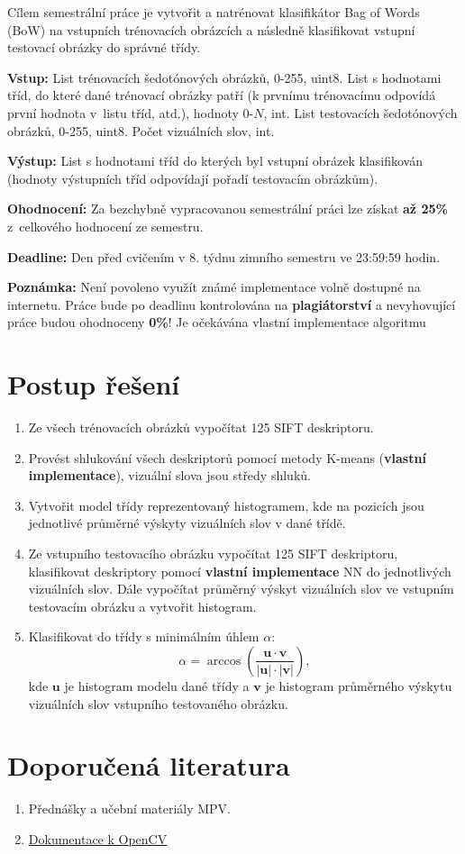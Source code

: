 \documentclass[12pt, a4paper]{article}
\begin{document}
\par{Cílem semestrální práce je vytvořit a natrénovat klasifikátor Bag of Words (BoW) na vstupních trénovacích obrázcích a následně klasifikovat vstupní testovací obrázky do správné třídy.}

\par{\textbf{Vstup:} List trénovacích šedotónových obrázků, 0-255, uint8. List s hodnotami tříd, do které dané trénovací obrázky patří (k prvnímu trénovacímu odpovídá první hodnota v~listu tříd, atd.), hodnoty 0-$N$, int. List testovacích šedotónových obrázků, 0-255, uint8. Počet vizuálních slov, int.}

\par{\textbf{Výstup:} List s hodnotami tříd do kterých byl vstupní obrázek klasifikován (hodnoty výstupních tříd odpovídají pořadí testovacím obrázkům).}

\par{\textbf{Ohodnocení:} Za bezchybně vypracovanou semestrální práci lze získat \textbf{až 25\%} z~celkového hodnocení ze semestru.}

\par{\textbf{Deadline:} Den před cvičením v 8. týdnu zimního semestru ve 23:59:59 hodin.}

\par{\textbf{Poznámka:} Není povoleno využít známé implementace volně dostupné na internetu. Práce bude po deadlinu kontrolována na \textbf{plagiátorství} a nevyhovující práce budou ohodnoceny \textbf{0\%}! Je očekávána vlastní implementace algoritmu}

\section*{Postup řešení}
\begin{enumerate}
	\item Ze všech trénovacích obrázků vypočítat 125 SIFT deskriptoru.
	\item Provést shlukování všech deskriptorů pomocí metody \mbox{K-means} (\textbf{vlastní implementace}), vizuální slova jsou středy shluků.
	\item Vytvořit model třídy reprezentovaný histogramem, kde na pozicích jsou jednotlivé průměrné výskyty vizuálních slov v dané třídě.
	\item Ze vstupního testovacího obrázku vypočítat 125 SIFT deskriptoru, klasifikovat de\-skri\-pto\-ry pomocí \textbf{vlastní implementace} NN do jednotlivých vizuálních slov. Dále vypočítat průměrný výskyt vizuálních slov ve vstupním testovacím obrázku a vytvořit histogram. 
	\item Klasifikovat do třídy s minimálním úhlem $\alpha$:
		\begin{equation}
			\alpha = \arccos \left( \frac{\bm{u} \cdot \bm{v}}{|\bm{u}| \cdot |\bm{v}|} \right),
		\end{equation}
		kde $\bm{u}$ je histogram modelu dané třídy a $\bm{v}$ je histogram průměrného výskytu vizuálních slov vstupního testovaného obrázku.
\end{enumerate}

\section*{Doporučená literatura}
\begin{enumerate}
	\item Přednášky a učební materiály MPV.
	\item \href{http://docs.opencv.org/}{Dokumentace k OpenCV}
\end{enumerate}
\end{document}
